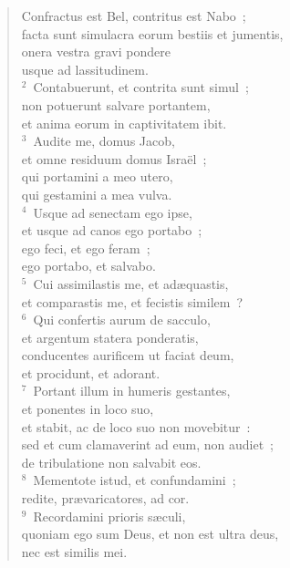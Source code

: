 \begin{flushleft}\begin{verse}\vspace{-19pt}\hspace{6pt}Confractus est Bel, contritus est Nabo~;\\\hspace{6pt} facta sunt simulacra eorum bestiis et jumentis,\\ onera vestra gravi pondere\\ usque ad lassitudinem.\\
${}^{2}$~Contabuerunt, et contrita sunt simul~;\\ non potuerunt salvare portantem,\\ et anima eorum in captivitatem ibit.\\
${}^{3}$~Audite me, domus Jacob,\\ et omne residuum domus Isra\"el~;\\ qui portamini a meo utero,\\ qui gestamini a mea vulva.\\
${}^{4}$~Usque ad senectam ego ipse,\\ et usque ad canos ego portabo~;\\ ego feci, et ego feram~;\\ ego portabo, et salvabo.\\
${}^{5}$~Cui assimilastis me, et ad\ae quastis,\\ et comparastis me, et fecistis similem~?\\
${}^{6}$~Qui confertis aurum de sacculo,\\ et argentum statera ponderatis,\\ conducentes aurificem ut faciat deum,\\ et procidunt, et adorant.\\
${}^{7}$~Portant illum in humeris gestantes,\\ et ponentes in loco suo,\\ et stabit, ac de loco suo non movebitur~:\\ sed et cum clamaverint ad eum, non audiet~;\\ de tribulatione non salvabit eos.\\
${}^{8}$~Mementote istud, et confundamini~;\\ redite, pr\ae varicatores, ad cor.\\
${}^{9}$~Recordamini prioris s\ae culi,\\ quoniam ego sum Deus, et non est ultra deus,\\ nec est similis mei.\\

\end{verse}
\end{flushleft}
